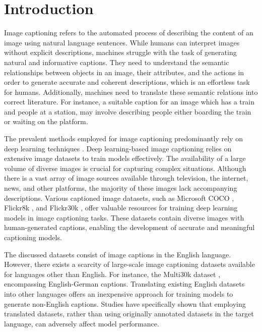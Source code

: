\documentclass[runningheads]{llncs}
\begin{document}
\section{Introduction}
Image captioning refers to the automated process of describing the content of an image using natural language sentences. While humans can interpret images without explicit descriptions, machines struggle with the task of generating natural and informative captions. They need to understand the semantic relationships between objects in an image, their attributes, and the actions in order to generate accurate and coherent descriptions, which is an effortless task for humans. Additionally, machines need to translate these semantic relations into correct literature. For instance, a suitable caption for an image which has a train and people at a station, may involve describing people either boarding the train or waiting on the platform.

The prevalent methods employed for image captioning predominantly rely on deep learning techniques \cite{Karpathy2015,Vinyals2015,Xu2015,Luo2023}. Deep learning-based image captioning relies on extensive image datasets to train models effectively. The availability of a large volume of diverse images is crucial for capturing complex situations. Although there is a vast array of image sources available through television, the internet, news, and other platforms, the majority of these images lack accompanying descriptions. Various captioned image datasets, such as Microsoft COCO \cite{MSCOCO}, Flickr8k \cite{Flickr8k}, and Flickr30k \cite{Flickr30k}, offer valuable resources for training deep learning models in image captioning tasks. These datasets contain diverse images with human-generated captions, enabling the development of accurate and meaningful captioning models.

The discussed datasets consist of image captions in the English language. However, there exists a scarcity of large-scale image captioning datasets available for languages other than English. For instance, the Multi30k dataset \cite{Multi30k}, encompassing English-German captions. Translating existing English datasets into other languages offers an inexpensive approach for training models to generate non-English captions. Studies \cite{Xue,Zoph,Rosa} have specifically shown that employing translated datasets, rather than using originally annotated datasets in the target language, can adversely affect model performance.
\end{document}
